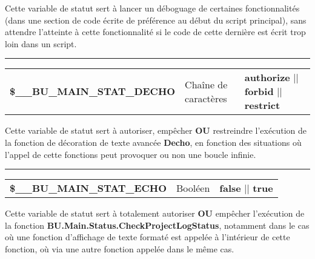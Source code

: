 \documentclass[a4paper,10pt]{article}
\begin{document}
\begin{justify}
    Cette variable de statut sert à lancer un déboguage de certaines fonctionnalités (dans une section de code écrite de préférence au début du script principal), sans attendre l'atteinte à cette fonctionnalité si le code de cette dernière est écrit trop loin dans un script.
\end{justify}


\par\noindent\rule{\textwidth}{0.4pt}

\begin{justify}
    \begin{tabular}{l|l|l}
        \textbf{\color{vars}\$\_\_BU\_MAIN\_STAT\_DECHO}  & Chaîne de caractères    & \textbf{authorize} || \textbf{forbid} || \textbf{restrict}\\[1\baselineskip]
    \end{tabular}
\end{justify}

\begin{justify}
    Cette variable de statut sert à autoriser, empêcher \textbf{OU} restreindre l'exécution de la fonction de décoration de texte avancée \textbf{\color{func}Decho}, en fonction des situations où l'appel de cette fonctions peut provoquer ou non une boucle infinie.
\end{justify}


\par\noindent\rule{\textwidth}{0.4pt}

\begin{justify}
    \begin{tabular}{l|l|l}
        \textbf{\color{vars}\$\_\_BU\_MAIN\_STAT\_ECHO}   & Booléen      & \textbf{false} || \textbf{true}\\[1\baselineskip]
    \end{tabular}
\end{justify}

\begin{justify}
    Cette variable de statut sert à totalement autoriser \textbf{OU} empêcher l'exécution de la fonction \textbf{\color{func}BU.Main.Status.CheckProjectLogStatus}, notamment dans le cas où une fonction d'affichage de texte formaté est appelée à l'intérieur de cette fonction, où via une autre fonction appelée dans le même cas.
\end{justify}

\end{document}
